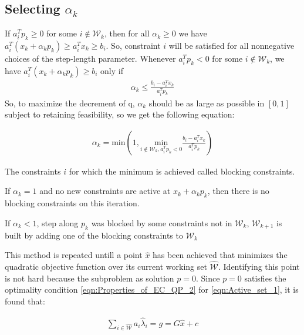 \subsection*{Selecting $\alpha_k$}
If $a_{i}^{T}p_{k} \geqslant 0$ for some $i\notin \mathcal{W}_k$, then for all $\alpha_k \geqslant 0$ we have $a_{i}^T(x_k+\alpha_kp_k)\geqslant a_{i}^Tx_k \geqslant b_i$. So, constraint $i$ will be satisfied for all nonnegative choices of the step-length parameter. Whenever $a_i^Tp_k < 0$ for some $i\notin \mathcal{W}_k$, we have  $a_{i}^T(x_k+\alpha_kp_k) \geqslant b_i$ only if
\begin{equation*}
	\begin{aligned}
		\alpha_k \leqslant \frac{b_i-a_i^Tx_k}{a_i^Tp_k}
	\end{aligned}
\end{equation*}
So, to maximize the decrement of q, $\alpha_k$ should be as large as possible in $[0,1]$ subject to retaining feasibility, so we get the following equation:

\begin{equation}
	\begin{aligned}
		\alpha_k = {\text{min}} \left( 1, \underset{i\notin \mathcal{W}_k,a_i^Tp_k<0 }{\text{min}} \frac{b_i-a_i^Tx_k}{a_i^Tp_k} \right) 
	\end{aligned}
	\label{eqn:Active_set_3}
\end{equation}

The constraints $i$ for which the minimum is achieved called blocking constraints. 

If $\alpha_k = 1$ and no new constraints are active at $ x_k+\alpha_kp_k $, then there is no blocking constraints on this iteration. 

If $\alpha_k < 1$, step along $p_k$ was blocked by some constraints not in $\mathcal{W}_k$, $\mathcal{W}_{k+1}$ is built by adding one of the blocking constraints to $\mathcal{W}_k$

This method is repeated untill a point $\hat{x}$ has been achieved that minimizes the quadratic objective function over its current working set $\hat{\mathcal{W}}$. Identifying this point is not hard because the subproblem as solution $p=0$. Since $p=0$ satisfies the optimality condition \ref{eqn:Properties_of_EC_QP_2} for \ref{eqn:Active_set_1}, it is found that:

\begin{equation}
	\begin{aligned}
		\underset{i\in \hat{\mathcal{W}}}{\sum}a_i\hat{\lambda}_i = g = G\hat{x}+c
	\end{aligned}
	\label{eqn:Active_set_4}
\end{equation}

